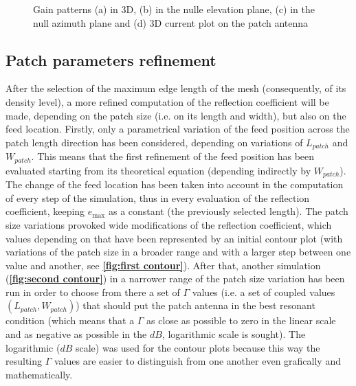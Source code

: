 \documentclass[10pt,a4paper,twocolumn]{article}
\begin{document}
{\begin{figure}[bt!]
		\begin{subfigure}{0.28\linewidth}
				\def\svgwidth{\linewidth}
			\tiny{}
			\caption{}	\end{subfigure}
		\hfill
		\begin{subfigure}{0.28\linewidth}
					\def\svgwidth{\linewidth}
			\tiny{}
			\caption{}	\end{subfigure}
		\hfill
		\begin{subfigure}{0.34\linewidth}
					\def\svgwidth{\linewidth}
			\tiny{}
			\caption{} \end{subfigure}
		\hfill
		\caption{Gain patterns (a) in 3D, (b) in the nulle elevation plane, (c) in the null azimuth plane and (d) 3D current plot on the patch antenna }
\end{figure}



\subsection*{Patch parameters refinement}
After the selection of the maximum edge length of the mesh (consequently, of its density level), a more refined computation of the reflection coefficient will be made, depending on the patch size (i.e. on its length and width), but also on the feed location. Firstly, only a parametrical variation of the feed position across the patch length direction has been considered, depending on variations of $L_{patch}$ and $W_{patch}$. This means that the first refinement of the feed position has been evaluated starting from its theoretical equation (depending indirectly by $W_{patch}$). The change of the feed location has been taken into account in the computation of every step of the simulation, thus in every evaluation of the reflection coefficient, keeping $e_{\max}$ as a constant (the previously selected length). The patch size variations provoked wide modifications of the reflection coefficient, which values depending on that have been represented by an initial contour plot (with variations of the patch size in a broader range and with a larger step between one value and another, see \textbf{\cref{fig:first contour}}). After that, another simulation (\textbf{\cref{fig:second contour}}) in a narrower range of the patch size variation has been run in order to choose from there a set of $\Gamma$ values (i.e. a set of coupled values $(L_{patch},W_{patch})$) that should put the patch antenna in the best resonant condition (which means that a $\Gamma$ as close as possible to zero in the linear scale and as negative as possible in the $dB$, logarithmic scale is sought). The logarithmic ($dB$ scale) was used for the contour plots because this way the resulting $\Gamma$ values are easier to distinguish from one another even grafically and mathematically. 


}
\end{document}

